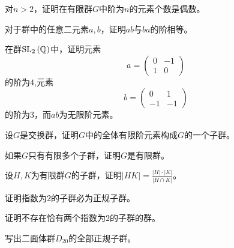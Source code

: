 \begin{prob}
对$n>2$，证明在有限群$G$中阶为$n$的元素个数是偶数。
\end{prob}

\begin{prob}
对于群中的任意二元素$a,b$，证明$ab$与$ba$的阶相等。
\end{prob}

\begin{prob}
在群${\rm SL}_{2}\left(\mathbb{Q}\right)$中，证明元素
\begin{equation*}
a=\begin{pmatrix}
0&-1\\
1&0
\end{pmatrix}
\end{equation*}
的阶为$4$,元素
\begin{equation*}
b=\begin{pmatrix}
0&1\\
-1&-1
\end{pmatrix}
\end{equation*}
的阶为$3$，而$ab$为无限阶元素。
\end{prob}

\begin{prob}
设$G$是交换群，证明$G$中的全体有限阶元素构成$G$的一个子群。
\end{prob}

\begin{prob}
如果$G$只有有限多个子群，证明$G$是有限群。
\end{prob}

\begin{prob}
设$H,K$为有限群$G$的子群，证明$\displaystyle \left\lvert HK \right\rvert =\frac{\left\lvert H \right\rvert \cdot \left\lvert K \right\rvert }{\left\lvert H\cap K \right\rvert }$。
\end{prob}

\begin{prob}
证明指数为$2$的子群必为正规子群。
\end{prob}

\begin{prob}
证明不存在恰有两个指数为$2$的子群的群。
\end{prob}

\begin{prob}
写出二面体群$D_{20}$的全部正规子群。
\end{prob}

